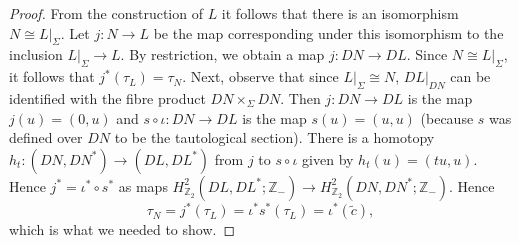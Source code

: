 \documentclass{amsart}
\theoremstyle{definition}
\theoremstyle{remark}
\numberwithin{equation}{section}
\begin{document}
\begin{proof}
From the construction of $L$ it follows that there is an isomorphism $N \cong L|_\Sigma$. Let $j : N \to L$ be the map corresponding under this isomorphism to the inclusion $L|_\Sigma \to L$. By restriction, we obtain a map $j : DN \to DL$. Since $N \cong L|_\Sigma$, it follows that $j^*(\tau_L) = \tau_N$. Next, observe that since $L|_\Sigma \cong N$, $DL|_{DN}$ can be identified with the fibre product $DN \times_{\Sigma} DN$. Then $j : DN \to DL$ is the map $j(u) = (0,u)$ and $s \circ \iota : DN \to DL$ is the map $s(u) = (u,u)$ (because $s$ was defined over $DN$ to be the tautological section). There is a homotopy $h_t : (DN , DN^*) \to (DL,DL^*)$ from $j$ to $s \circ \iota$ given by $h_t(u) = (tu,u)$. Hence $j^* = \iota^* \circ s^*$ as maps $H^2_{\mathbb{Z}_2}(DL , DL^* ; \mathbb{Z}_-) \to H^2_{\mathbb{Z}_2}(DN , DN^* ; \mathbb{Z}_-)$. Hence
\[
\tau_N = j^*(\tau_L) = \iota^* s^*(\tau_L) = \iota^*( \widetilde{c}),
\]
which is what we needed to show.
\end{proof}
\end{document}

